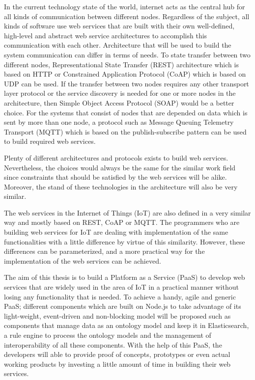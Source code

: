 
In the current technology state of the world, internet acts as the central hub for all kinds of communication between different nodes. Regardless of the subject, all kinds of software use web services that are built with their own well-defined, high-level and abstract web service architectures to accomplish this communication with each other. Architecture that will be used to build the system communication can differ in terms of needs. To state transfer between two different nodes, Representational State Transfer (REST) architecture which is based on HTTP or Constrained Application Protocol (CoAP) which is based on UDP can be used. If the transfer between two nodes requires any other transport layer protocol or the service discovery is needed for one or more nodes in the architecture, then Simple Object Access Protocol (SOAP) would be a better choice. For the systems that consist of nodes that are depended on data which is sent by more than one node, a protocol such as Message Queuing Telemetry Transport (MQTT) which is based on the publish-subscribe pattern can be used to build required web services.

Plenty of different architectures and protocols exists to build web services. Nevertheless, the choices would always be the same for the similar work field since constraints that should be satisfied by the web services will be alike. Moreover, the stand of these technologies in the architecture will also be very similar.

The web services in the Internet of Things (IoT) are also defined in a very similar way and mostly based on REST, CoAP or MQTT. The programmers who are building web services for IoT are dealing with implementation of the same functionalities with a little difference by virtue of this similarity. However, these differences can be parameterized, and a more practical way for the implementation of the web services can be achieved.

The aim of this thesis is to build a Platform as a Service (PaaS) to develop web services that are widely used in the area of IoT in a practical manner without losing any functionality that is needed. To achieve a handy, agile and generic PaaS; different components which are built on Node.js to take advantage of its light-weight, event-driven and non-blocking model will be proposed such as components that manage data as an ontology model and keep it in Elasticsearch, a rule engine to process the ontology models and the management of interoperability of all these components. With the help of this PaaS, the developers will able to provide proof of concepts, prototypes or even actual working products by investing a little amount of time in building their web services.
